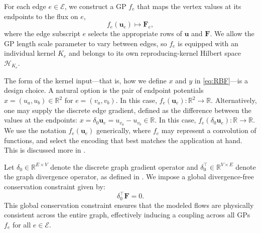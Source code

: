 \documentclass{article}
\theoremstyle{definition}
\theoremstyle{remark}
\newcommand{\R}{\mathbb{R}}
\begin{document}
For each edge $e \in \mathcal{E}$, we construct a GP $f_e$ that maps the vertex values at its endpoints to the flux on $e$, \begin{equation}
    f_e(\mathbf{u}_e) \mapsto \mathbf{F}_e,
\end{equation}
where the edge subscript $e$ selects the appropriate rows of $\mathbf{u}$ and $\mathbf{F}$.
We allow the GP length scale parameter to vary between edges, so $f_e$ is equipped with an individual kernel $K_e$ and belongs to its own reproducing-kernel Hilbert space $\mathcal{H}_{K_e}$.

The form of the kernel input---that is, how we define $x$ and $y$ in \eqref{eq:RBF}---is a design choice. A natural option is the pair of endpoint potentials $x=(u_a,u_b)\in\mathbb{R}^2$ for $e=(v_a,v_b)$. In this case, $f_e(\mathbf{u}_e):\mathbb{R}^2\rightarrow\mathbb{R}$. Alternatively, one may supply the discrete edge gradient, defined as the difference between the values at the endpoints: $x=\delta_0 \mathbf{u}_e=u_{v_a}-u_{v_b}\in\mathbb{R}$. In this case, $f_e(\delta_0\mathbf{u}_e):\mathbb{R}\rightarrow\mathbb{R}$. We use the notation $f_e(\mathbf{u}_e)$ generically, where $f_e$ may represent a convolution of functions, and select the encoding that best matches the application at hand. This is discussed more in . 

Let $\delta_0 \in \R^{E \times V}$ denote the discrete graph gradient operator and $\delta_0^\intercal \in \R^{V \times E}$ denote the graph divergence operator, as defined in . We impose a global divergence-free conservation constraint given by:
\begin{equation}
	\delta_0 ^\intercal \mathbf{F}  = 0. 
\end{equation}
This global conservation constraint ensures that the modeled flows are physically consistent across the entire graph, effectively inducing a coupling across all GPs $f_e$ for all $e \in \mathcal{E}$.
\end{document}
